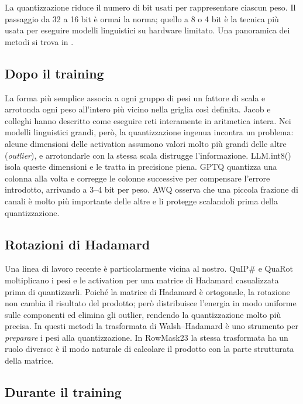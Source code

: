La quantizzazione riduce il numero di bit usati per rappresentare ciascun peso. Il passaggio da 32 a 16 bit è ormai la norma; quello a 8 o 4 bit è la tecnica più usata per eseguire modelli linguistici su hardware limitato. Una panoramica dei metodi si trova in \cite{gholami2022survey}.

\subsection{Dopo il training}

La forma più semplice associa a ogni gruppo di pesi un fattore di scala e arrotonda ogni peso all'intero più vicino nella griglia così definita. Jacob e colleghi \cite{jacob2018quantization} hanno descritto come eseguire reti interamente in aritmetica intera. Nei modelli linguistici grandi, però, la quantizzazione ingenua incontra un problema: alcune dimensioni delle activation assumono valori molto più grandi delle altre (\emph{outlier}), e arrotondarle con la stessa scala distrugge l'informazione. LLM.int8() \cite{dettmers2022llmint8} isola queste dimensioni e le tratta in precisione piena. GPTQ \cite{frantar2023gptq} quantizza una colonna alla volta e corregge le colonne successive per compensare l'errore introdotto, arrivando a 3--4 bit per peso. AWQ \cite{lin2024awq} osserva che una piccola frazione di canali è molto più importante delle altre e li protegge scalandoli prima della quantizzazione.

\subsection{Rotazioni di Hadamard}

Una linea di lavoro recente è particolarmente vicina al nostro. QuIP\# \cite{tseng2024quipsharp} e QuaRot \cite{ashkboos2024quarot} moltiplicano i pesi e le activation per una matrice di Hadamard casualizzata prima di quantizzarli. Poiché la matrice di Hadamard è ortogonale, la rotazione non cambia il risultato del prodotto; però distribuisce l'energia in modo uniforme sulle componenti ed elimina gli outlier, rendendo la quantizzazione molto più precisa. In questi metodi la trasformata di Walsh--Hadamard è uno strumento per \emph{preparare} i pesi alla quantizzazione. In RowMask23 la stessa trasformata ha un ruolo diverso: è il modo naturale di calcolare il prodotto con la parte strutturata della matrice.

\subsection{Durante il training}

